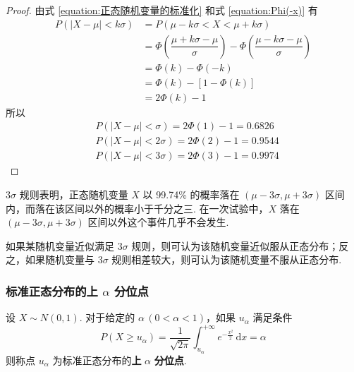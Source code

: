 \begin{proof}
    由式 \eqref{equation:正态随机变量的标准化} 和式 \eqref{equation:Phi(-x)} 有
    $$
    \begin{aligned}
        P(|X-\mu| < k \sigma) &= P(\mu - k \sigma < X < \mu + k \sigma) \\
        &= \varPhi(\dfrac{\mu + k \sigma - \mu}{\sigma}) - \varPhi(\dfrac{\mu - k \sigma - \mu}{\sigma}) \\
        &= \varPhi(k) - \varPhi(-k) \\
        &= \varPhi(k) - [1 - \varPhi(k)] \\
        &= 2\varPhi(k) - 1
    \end{aligned}
    $$
    所以
    $$
    \begin{aligned}
        & P(|X - \mu| < \sigma) = 2\varPhi(1) - 1 = 0.6826 \\
        & P(|X - \mu| < 2\sigma) = 2\varPhi(2) - 1 = 0.9544 \\
        & P(|X - \mu| < 3\sigma) = 2\varPhi(3) - 1 = 0.9974
    \end{aligned}
    $$

    \vspace{-1.5em}
\end{proof}

$3\sigma$ 规则表明，正态随机变量 $X$ 以 99.74\% 的概率落在 $(\mu - 3\sigma, \mu + 3\sigma)$ 区间内，而落在该区间以外的概率小于千分之三. 在一次试验中，$X$ 落在 $(\mu - 3\sigma, \mu + 3\sigma)$ 区间以外这个事件几乎不会发生.

如果某随机变量近似满足 $3\sigma$ 规则，则可认为该随机变量近似服从正态分布；反之，如果随机变量与 $3\sigma$ 规则相差较大，则可认为该随机变量不服从正态分布.

\subsubsection{标准正态分布的上 \texorpdfstring{$\alpha$}{} 分位点}

\begin{definition}
    \indent 设 $X \sim N(0,1)$. 对于给定的 $\alpha \, (0 < \alpha < 1)$，如果 $u_{\alpha}$ 满足条件
    $$
    P(X \geqslant u_{\alpha}) = \dfrac{1}{\sqrt{2\pi}} \int_{u_{\alpha}}^{+\infty} e^{-\frac{x^2}{2}} \, \text{d}x = \alpha
    $$
    则称点 $u_{\alpha}$ 为标准正态分布的\textbf{上} $\alpha$ \textbf{分位点}.
\end{definition}

